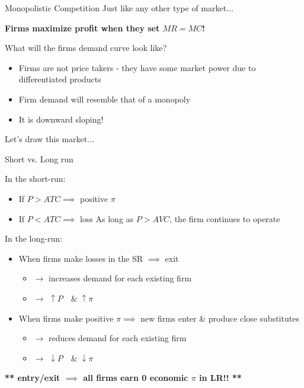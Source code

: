 \documentclass[compress]{beamer}
\begin{document}
\begin{frame}{Monopolistic Competition}
    Just like any other type of market...
    \begin{center}
        \textbf{Firms maximize profit when they set $MR = MC$!}
    \end{center}
    \begin{block}{What will the firms demand curve look like?}
    \pause
        \begin{itemize}
            \item Firms are not price takers - they have some market power due to differentiated products
            \item Firm demand will resemble that of a monopoly
            \item It is downward sloping!
        \end{itemize}
    \end{block}
    \vspace{4mm}
\begin{center}
    Let's draw this market...
\end{center}
\end{frame}

\begin{frame}{Short vs. Long run}
    \begin{block}{In the short-run:}
        \begin{itemize}
            \item If $P > ATC \implies$ positive $\pi$
            \item If $P < ATC \implies$ loss
As long as $P > AVC$, the firm continues to operate
        \end{itemize}
    \end{block}

    \begin{block}{In the long-run:}
        \begin{itemize}
            \item When firms make losses in the SR $\implies$ exit
            \begin{itemize}
                \item $\to$ increases demand for each existing firm
                \item $\to$ $\uparrow P \quad \& \; \uparrow \pi$
            \end{itemize}
            \item When firms make positive $\pi \implies$ new firms enter \& produce close substitutes
            \begin{itemize}
                \item $\to$ reduces demand for each existing firm
                \item $\to$ $\downarrow P \quad\& \; \downarrow \pi$
            \end{itemize}
        \end{itemize}
\begin{center}
\textbf{** entry/exit $\implies$ all firms earn 0 economic $\pi$ in LR!! **}
\end{center}
    \end{block}
\end{frame}
\end{document}
